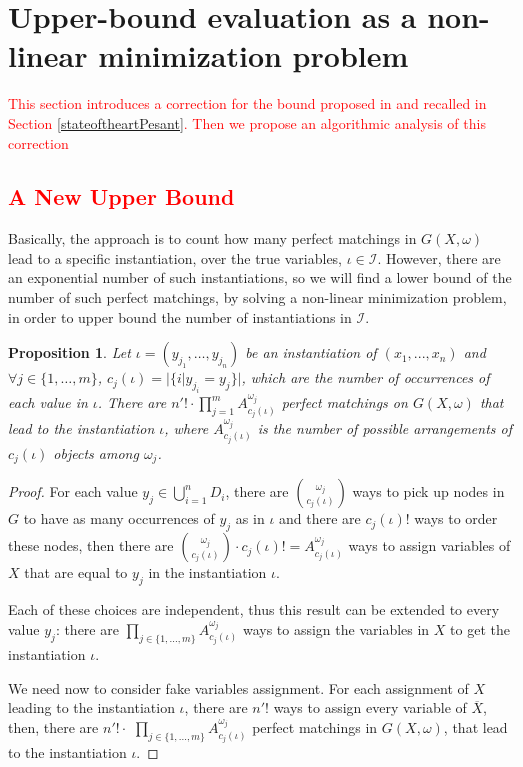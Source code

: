 \documentclass[jair,twoside,11pt,theapa]{article}
\newtheorem{proposition}[theorem]{Proposition}
\newcommand{\major}[1]{\textcolor{red}{#1}}
\newcommand{\var}[1]{x_{#1}}
\newcommand{\Domain}{D}
\newcommand{\fromto}[3]{#1 \in \lbrace #2, \ldots, #3 \rbrace}
\begin{document}
\section{Upper-bound evaluation as a non\--linear minimization problem}

\major{This section introduces a correction for the bound proposed in \cite{PesantQZ12} and recalled in Section \ref{stateoftheartPesant}. Then we propose an algorithmic analysis of this correction}

\subsection{\major{A New Upper Bound}}
\label{calculatoryApproach}
Basically, the approach is to count how many perfect matchings in $G(X, \omega)$ lead to a specific instantiation, over the true variables, $\iota \in \mathcal{I}$. However, there are an exponential number of such instantiations, so we will find a lower bound of the number of such perfect matchings, by solving a non\--linear minimization problem, in order to upper bound the number of instantiations in $\mathcal{I}$.

\begin{proposition}
Let $\iota=(y_{j_1}, \ldots, y_{j_n})$ be an instantiation of $(\var{1}, ..., \var{n})$ and $\forall \fromto{j}{1}{m}$, $c_j(\iota)= |\lbrace i | y_{j_i}=y_j\rbrace|$, which are the number of occurrences of each value in $\iota$.
There are $n'! \cdot \prod_{j=1}^m A^{\omega_j}_{c_j(\iota)} $ perfect matchings on $G(X, \omega)$ that lead to the instantiation $\iota$, where $A^{\omega_j}_{c_j(\iota)}$ is the number of possible arrangements of $c_j(\iota)$ objects among $\omega_j$.
\label{nbPerfectMatchingleadingtoaninstantiation}
\end{proposition}

\begin{proof}
For each value $y_j \in \bigcup_{i=1}^n \Domain_i$, there are $\omega_j \choose c_j(\iota)$ ways to pick up nodes in $G$ to have as many occurrences of $y_j$ as in $\iota$ and there are $c_j(\iota)!$ ways to order these nodes, then there are $\binom{\omega_j}{c_j(\iota)} \cdot c_j(\iota)! = A^{\omega_j}_{c_j(\iota)}$  ways to assign variables of $X$ that are equal to $y_j$ in the instantiation $\iota$.

Each of these choices are independent, thus this result can be extended to every value $y_j$: there are $\underset{j\in \lbrace 1,...,m\rbrace}{\prod} A^{\omega_j}_{c_j(\iota)}$ ways to assign the variables in $X$ to get the instantiation $\iota$.

We need now to consider fake variables assignment. For each assignment of $X$ leading to the instantiation $\iota$, there are $n'!$ ways to assign every variable of $\overline{X}$, then, there are $n'! \cdot$ $\underset{j\in \lbrace 1,...,m\rbrace}{\prod} A^{\omega_j}_{c_j(\iota)}$ perfect matchings in $G(X, \omega)$, that lead to the instantiation $\iota$.
\end{proof}
\end{document}
